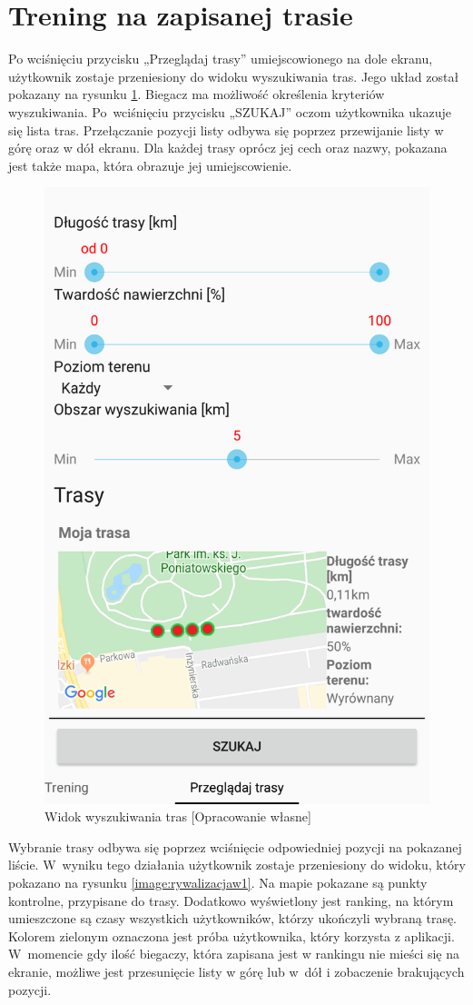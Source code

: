 \section{Trening na zapisanej trasie}\label{chap:trening-na-zapisanej}
Po wciśnięciu przycisku  „Przeglądaj trasy” umiejscowionego na dole ekranu, użytkownik zostaje przeniesiony do widoku wyszukiwania tras. Jego układ został pokazany na rysunku \ref{image:wyszukiwanie}. Biegacz ma możliwość określenia kryteriów wyszukiwania. Po~wciśnięciu przycisku „SZUKAJ” oczom użytkownika ukazuje się lista tras. Przełączanie pozycji listy odbywa się poprzez przewijanie listy w górę oraz w dół ekranu. Dla każdej trasy oprócz jej cech oraz nazwy, pokazana jest także mapa, która obrazuje jej umiejscowienie.
\begin{figure}[h]\label{fig:xamarin_model}
\begin{center}
\includegraphics[width=.5\linewidth,frame]{img/wyszukiwanie.png}
\caption{Widok wyszukiwania tras [Opracowanie własne]}\label{image:wyszukiwanie}
\end{center}
\end{figure}

Wybranie trasy odbywa się poprzez wciśnięcie odpowiedniej pozycji na pokazanej liście. W~wyniku tego działania użytkownik zostaje przeniesiony do widoku, który pokazano na rysunku \ref{image:rywalizacjaw1}. Na mapie pokazane są punkty kontrolne, przypisane do trasy. Dodatkowo wyświetlony jest ranking, na którym umieszczone są czasy wszystkich użytkowników, którzy ukończyli wybraną trasę. Kolorem zielonym oznaczona jest próba użytkownika, który korzysta z aplikacji. W~momencie gdy ilość biegaczy, która zapisana jest w rankingu nie mieści się na ekranie, możliwe jest przesunięcie listy w górę lub w~dół i zobaczenie brakujących pozycji.


